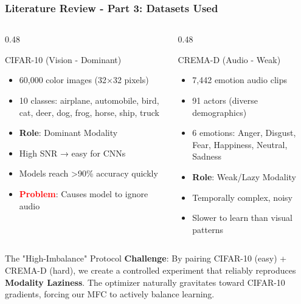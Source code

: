 \documentclass[serif, aspectratio=169]{beamer}
\begin{document}
\begin{frame}{}
    \frametitle<presentation>{Literature Review - Part 3: Datasets Used}
    
    \begin{columns}[T]
        \begin{column}{0.48\textwidth}
            \begin{block}{CIFAR-10 (Vision - Dominant)}
                \small
                \begin{itemize}
                    \item 60,000 color images (32×32 pixels)
                    \item 10 classes: airplane, automobile, bird, cat, deer, dog, frog, horse, ship, truck
                    \item \textbf{Role}: Dominant Modality
                    \item High SNR → easy for CNNs
                    \item Models reach \textgreater90\% accuracy quickly
                    \item \textcolor{red}{\textbf{Problem}}: Causes model to ignore audio
                \end{itemize}
            \end{block}
        \end{column}
        
        \begin{column}{0.48\textwidth}
            \begin{block}{CREMA-D (Audio - Weak)}
                \small
                \begin{itemize}
                    \item 7,442 emotion audio clips
                    \item 91 actors (diverse demographics)
                    \item 6 emotions: Anger, Disgust, Fear, Happiness, Neutral, Sadness
                    \item \textbf{Role}: Weak/Lazy Modality
                    \item Temporally complex, noisy
                    \item Slower to learn than visual patterns
                \end{itemize}
            \end{block}
        \end{column}
    \end{columns}
    
    \vspace{0.3cm}
    
    \begin{alertblock}{The "High-Imbalance" Protocol}
        \small
        \textbf{Challenge}: By pairing CIFAR-10 (easy) + CREMA-D (hard), we create a controlled experiment that reliably reproduces \textbf{Modality Laziness}. The optimizer naturally gravitates toward CIFAR-10 gradients, forcing our MFC to actively balance learning.
    \end{alertblock}
\end{frame}
\end{document}
